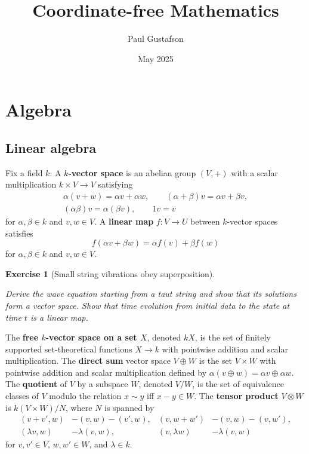 \documentclass{article}
\title{Coordinate-free Mathematics}
\author{Paul Gustafson}
\date{May 2025}
\newtheorem{exercise}{Exercise}
\begin{document}
\maketitle
\tableofcontents
\newpage

\section{Algebra}

\subsection{Linear algebra}

Fix a field $k$. A \textbf{$k$-vector space} is an abelian group $(V,+)$
with a scalar multiplication $k\times V\to V$ satisfying
\[
\begin{gathered}
\alpha(v+w)=\alpha v+\alpha w,\qquad
(\alpha+\beta)v=\alpha v+\beta v,\\
(\alpha\beta)v=\alpha(\beta v),\qquad 1v=v
\end{gathered}
\]
for $\alpha,\beta\in k$ and $v,w\in V$. A \textbf{linear map}
$f:V\to U$ between $k$-vector spaces
satisfies
\[
f(\alpha v+\beta w)=\alpha f(v)+\beta f(w)
\]
for $\alpha,\beta\in k$ and $v,w\in V$.

\begin{exercise}[Small string vibrations obey superposition]
\label{ex:wave-superposition}\leavevmode\par
\textit{Derive the wave equation starting from a taut string and show that
its solutions form a vector space. Show that time evolution from initial data
to the state at time $t$ is a linear map.}
\end{exercise}

The \textbf{free $k$-vector space on a set $X$}, denoted $kX$, is the set of finitely supported set-theoretical functions $X \to k$ with pointwise addition and scalar multiplication. The \textbf{direct sum} vector space $V \oplus W$ is the set $V \times W$ with pointwise addition and scalar multiplication defined by $\alpha (v \oplus w) = \alpha v \oplus \alpha w$. The \textbf{quotient} of $V$ by a subspace $W$, denoted $V / W$, is the set of equivalence classes of $V$ modulo the relation $x \sim y$ iff $x - y \in W$. The \textbf{tensor product} $V\otimes W$ is $k(V\times W)/N$, where $N$ is spanned by
\[
\begin{aligned}
(v+v',w)&-(v,w)-(v',w),&
(v,w+w')&-(v,w)-(v,w'),\\
(\lambda v,w)&-\lambda(v,w),&
(v,\lambda w)&-\lambda(v,w)
\end{aligned}
\]
for $v,v'\in V$, $w,w'\in W$, and $\lambda\in k$.
\end{document}
